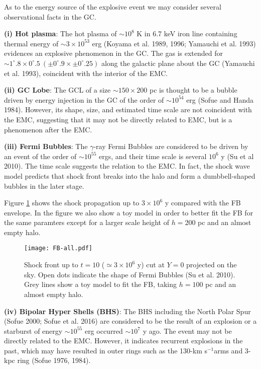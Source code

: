 \documentclass[useAMS,usenatbib]{mn2e}
\def\kms{km s$^{-1}$}
\def\deg{^\circ}\def\Deg{^\circ}
\begin{document}
As to the energy source of the explosive event we may consider several observational facts in the GC.

{\bf (i)  Hot plasma}: The hot plasma of $ \sim 10^8$ K in 6.7 keV iron line containing thermal energy of $ \sim 3 \times 10^{53}$ erg (Koyama et al. 1989, 1996; Yamauchi et al. 1993) evidences an explosive phenomenon in the GC. The gas is extended for $\sim 1\deg.8 \times 0\deg.5 \ (\pm 0\deg.9\times \pm 0\deg.25)$ along the galactic plane about the GC (Yamauchi et al. 1993), coincident with the interior of the EMC.  

{\bf (ii) GC Lobe}: The GCL of a size $\sim 150\times 200$ pc is thought to be a bubble driven by energy injection in the GC of the order of $\sim 10^ {54}$ erg (Sofue and Handa 1984). However, its shape, size, and estimated time scale are not coincident with the EMC, suggesting that it may not be directly related to EMC, but is a phenomenon after the EMC.

{\bf (iii) Fermi Bubbles}: The $\gamma$-ray Fermi Bubbles are considered to be driven by an event of the order of $\sim 10^{55}$ ergs, and  their time scale is several $10^6$ y (Su et al 2010). The time scale suggests the relation to the EMC. In fact, the shock wave model predicts that shock front breaks into the halo and form a dumbbell-shaped bubbles in the later stage. 

Figure \ref{bhs} shows the shock propagation up to $3\times 10^6$ y compared with the FB envelope. In the figure we also show a toy model in order to better fit the FB for the same paramters except for a larger scale height of $h=200$ pc and an almost empty halo.


\begin{figure} 
\begin{center} 
\texttt{[image: FB-all.pdf]} \\ 
\end{center}
\caption{Shock front up to $t=10$ ($\simeq 3\times 10^6$ y) cut at $Y=0$ projected on the sky. Open dots indicate the shape of Fermi Bubbles (Su et al. 2010). Grey lines show a toy model to fit the FB, taking $h=100$ pc and an almost empty halo.  }
 \label{bhs}  
\end{figure}  

{\bf (iv) Bipolar Hyper Shells (BHS)}: The BHS including the North Polar Spur (Sofue 2000; Sofue et al. 2016) are considered to be the result of an explosion or a starburst of energy $\sim 10^{55}$ erg occurred $\sim 10^7$ y ago. The event may not be directly related to the EMC. However, it indicates recurrent explosions in the past, which may have resulted in outer rings such as the 130-\kms arms and 3-kpc ring (Sofue 1976, 1984).
  
\end{document}
